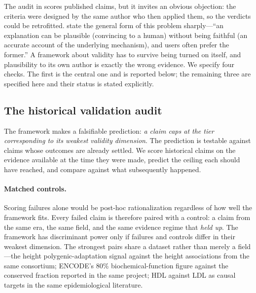 \documentclass{article}
\begin{document}
The audit in  scores published claims, but it invites an obvious objection: the criteria were designed by the same author who then applied them, so the verdicts could be retrofitted. \citet{meloux2026validating} state the general form of this problem sharply---``an explanation can be plausible (convincing to a human) without being faithful (an accurate account of the underlying mechanism), and users often prefer the former.'' A framework about validity has to survive being turned on itself, and plausibility to its own author is exactly the wrong evidence. We specify four checks. The first is the central one and is reported below; the remaining three are specified here and their status is stated explicitly.

\subsection{The historical validation audit}
\label{sec:historical-audit}

The framework makes a falsifiable prediction: \emph{a claim caps at the tier corresponding to its weakest validity dimension}. The prediction is testable against claims whose outcomes are already settled. We score historical claims on the evidence available at the time they were made, predict the ceiling each should have reached, and compare against what subsequently happened.

\paragraph{Matched controls.} Scoring failures alone would be post-hoc rationalization regardless of how well the framework fits. Every failed claim is therefore paired with a control: a claim from the same era, the same field, and the same evidence regime that \emph{held up}. The framework has discriminant power only if failures and controls differ in their weakest dimension. The strongest pairs share a dataset rather than merely a field---the height polygenic-adaptation signal against the height associations from the same consortium; ENCODE's 80\% biochemical-function figure against the conserved fraction reported in the same project; HDL against LDL as causal targets in the same epidemiological literature.
\end{document}
